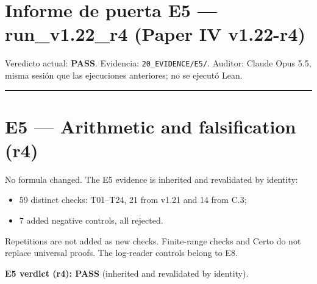 \documentclass[
]{article}
\author{}
\date{}
\providecommand{\tightlist}{%
  \setlength{\itemsep}{0pt}\setlength{\parskip}{0pt}}
\begin{document}
\section{Informe de puerta E5 --- run\_v1.22\_r4 (Paper IV
v1.22-r4)}\label{informe-de-puerta-e5--run_v122_r4-paper-iv-v122-r4}

Veredicto actual: \textbf{PASS}. Evidencia: \texttt{20\_EVIDENCE/E5/}.
Auditor: Claude Opus 5.5, misma sesión que las ejecuciones anteriores;
no se ejecutó Lean.

\begin{center}\rule{0.5\linewidth}{0.5pt}\end{center}

\section{E5 --- Arithmetic and falsification
(r4)}\label{e5--arithmetic-and-falsification-r4}

No formula changed. The E5 evidence is inherited and revalidated by
identity:

\begin{itemize}
\tightlist
\item
  59 distinct checks: T01--T24, 21 from v1.21 and 14 from C.3;
\item
  7 added negative controls, all rejected.
\end{itemize}

Repetitions are not added as new checks. Finite-range checks and Certo
do not replace universal proofs. The log-reader controls belong to E8.

\textbf{E5 verdict (r4): PASS} (inherited and revalidated by identity).
\end{document}
